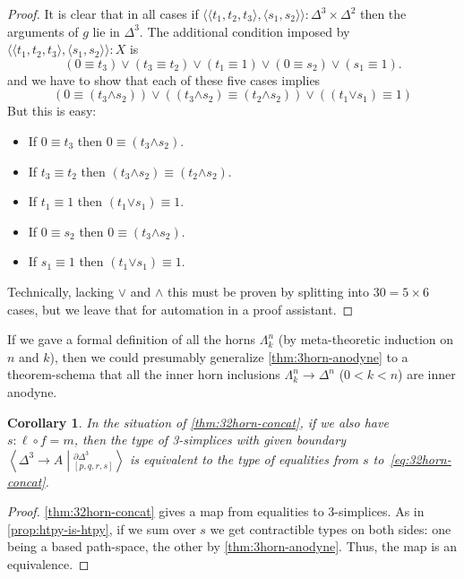 \documentclass{amsart}
\theoremstyle{plain}
\newtheorem{cor}[thm]{Corollary}
\theoremstyle{definition}
\theoremstyle{remark}
\numberwithin{equation}{section}
\newcommand{\ndexten}[4]{\left\langle #1 \to #2 \middle|^{#3}_{#4}\right\rangle}
\newcommand{\jdeq}{\equiv}
\newcommand{\pair}[1]{\langle #1\rangle}
\begin{document}
\begin{proof}
  It is clear that in all cases if $\pair{\pair{t_1,t_2,t_3},\pair{s_1,s_2}}:\Delta^3\times\Delta^2$ then the arguments of $g$ lie in $\Delta^3$.
  The additional condition imposed by $\pair{\pair{t_1,t_2,t_3},\pair{s_1,s_2}}:X$ is
  \begin{equation*}
    (0\jdeq t_3) \lor (t_3\jdeq t_2) \lor (t_1 \jdeq 1) \lor (0\jdeq s_2) \lor (s_1\jdeq 1).
  \end{equation*}
  and we have to show that each of these five cases implies
  \[ (0\jdeq (t_3 \mathbin{\pmb{\land}} s_2)) \lor
  ((t_3 \mathbin{\pmb{\land}} s_2) \jdeq (t_2 \mathbin{\pmb{\land}} s_2)) \lor
  ((t_1 \mathbin{\pmb{\lor}} s_1)\jdeq 1)
  \]
  But this is easy:
  \begin{itemize}
  \item If $0\jdeq t_3$ then $0\jdeq (t_3 \mathbin{\pmb{\land}} s_2)$.
  \item If $t_3\jdeq t_2$ then $(t_3 \mathbin{\pmb{\land}} s_2) \jdeq (t_2 \mathbin{\pmb{\land}} s_2)$.
  \item If $t_1 \jdeq 1$ then $(t_1 \mathbin{\pmb{\lor}} s_1)\jdeq 1$.
  \item If $0\jdeq s_2$ then $0\jdeq (t_3 \mathbin{\pmb{\land}} s_2)$.
  \item If $s_1\jdeq 1$ then $(t_1 \mathbin{\pmb{\lor}} s_1)\jdeq 1$.
  \end{itemize}
  Technically, lacking $\pmb{\lor}$ and $\pmb{\land}$ this must be proven by splitting into $30 = 5\times 6$ cases, but we leave that for automation in a proof assistant.
\end{proof}

If we gave a formal definition of all the horns $\Lambda^n_k$ (by meta-theoretic induction on $n$ and $k$), then we could presumably generalize \cref{thm:3horn-anodyne} to a theorem-schema that all the inner horn inclusions $\Lambda^n_k\to \Delta^n$ ($0<k<n$) are inner anodyne.

\begin{cor}\label{thm:32horn-is-concat}
  In the situation of \cref{thm:32horn-concat}, if we also have $s:\ell\circ f = m$, then the type of 3-simplices with given boundary $\ndexten{\Delta^3}{A}{\partial\Delta^3}{[p,q,r,s]}$ is equivalent to the type of equalities from $s$ to~\eqref{eq:32horn-concat}.
\end{cor}
\begin{proof}
  \cref{thm:32horn-concat} gives a map from equalities to 3-simplices.
  As in \cref{prop:htpy-is-htpy}, if we sum over $s$ we get contractible types on both sides: one being a based path-space, the other by \cref{thm:3horn-anodyne}.
  Thus, the map is an equivalence.
\end{proof}
\end{document}

